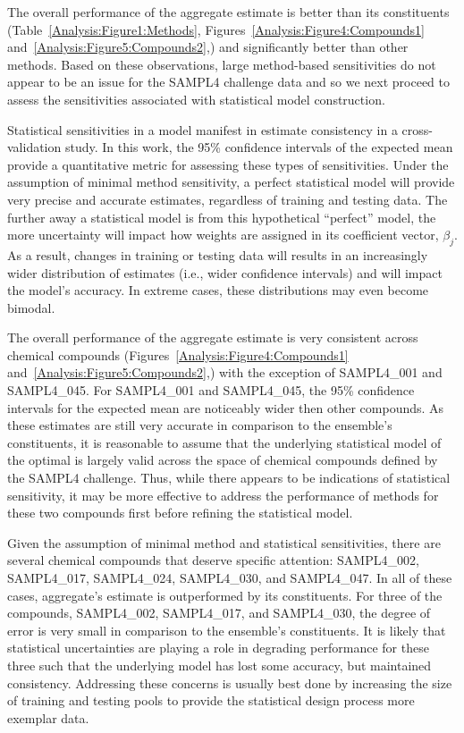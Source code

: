 \documentclass[journal=jpcbfk, manuscript=article]{achemso}
\newcommand{\+}[1]{\ensuremath{\mathbf{#1}}}
\newcommand{\rev}[1]{#1}
\begin{document}
\rev{The overall performance of the aggregate estimate is better than its constituents (Table~\ref{Analysis:Figure1:Methods}, Figures~\ref{Analysis:Figure4:Compounds1} and~\ref{Analysis:Figure5:Compounds2},) and significantly better than other methods.
Based on these observations, large method-based sensitivities do not appear to be an issue for the SAMPL4 challenge data and so we next proceed to assess
the sensitivities associated with statistical model construction.}

\rev{Statistical sensitivities in a model manifest in estimate consistency in a cross-validation study.
In this work, the 95\% confidence intervals of the expected mean provide a quantitative metric for assessing these types of sensitivities. 
Under the assumption of minimal method sensitivity, a perfect statistical model will provide very precise and accurate estimates, regardless of training and testing data.
The further away a statistical model is from this hypothetical ``perfect'' model, the more uncertainty will impact how weights are assigned in its coefficient vector, $\beta_j$.
As a result, changes in training or testing data will results in an increasingly wider distribution of estimates (i.e., wider confidence intervals) and will impact the model's accuracy.
In extreme cases, these distributions may even become bimodal.}

\rev{The overall performance of the aggregate estimate is very consistent across chemical compounds (Figures~\ref{Analysis:Figure4:Compounds1} and~\ref{Analysis:Figure5:Compounds2},) with the exception of SAMPL4\_001 and SAMPL4\_045.
For SAMPL4\_001 and SAMPL4\_045, the 95\% confidence intervals for the expected mean are noticeably wider then other compounds.
As these estimates are still very accurate in comparison to the ensemble's constituents, it is reasonable to assume that the underlying statistical model of the optimal is largely valid across the space of chemical compounds defined by the SAMPL4 challenge.
Thus, while there appears to be indications of statistical sensitivity, it may be more effective to address the performance of methods for these two compounds first before refining the statistical model.}

\rev{Given the assumption of minimal method and statistical sensitivities, there are several chemical compounds that deserve specific attention: SAMPL4\_002, SAMPL4\_017, SAMPL4\_024, SAMPL4\_030, and SAMPL4\_047.
In all of these cases, aggregate's estimate is outperformed by its constituents.
For three of the compounds,  SAMPL4\_002, SAMPL4\_017, and SAMPL4\_030, the degree of error is very small in comparison to the ensemble's constituents. 
It is likely that statistical uncertainties are playing a role in degrading performance for these three such that the underlying model has lost some accuracy, but maintained consistency.
Addressing these concerns is usually best done by increasing the size of training and testing pools to provide the statistical design process more exemplar data.}
\end{document}
